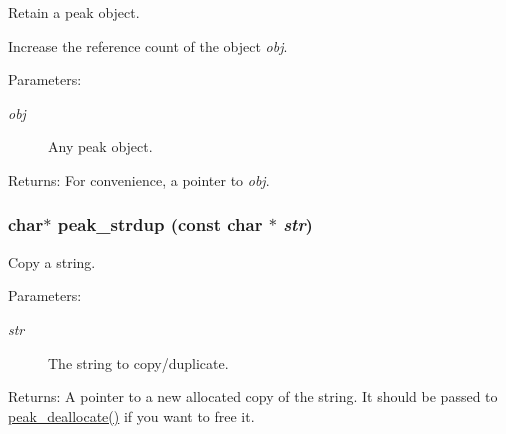 Retain a peak object. 

Increase the reference count of the object {\em obj\/}.

\begin{Desc}
\item[Parameters:]
\begin{description}
\item[{\em obj}]Any peak object.\end{description}
\end{Desc}
\begin{Desc}
\item[Returns:]For convenience, a pointer to {\em obj\/}. \end{Desc}
\hypertarget{group__alloc_ga5}{
\subsubsection[peak\_\-strdup]{\setlength{\rightskip}{0pt plus 5cm}char$\ast$ peak\_\-strdup (const char $\ast$ {\em str})}}
\label{group__alloc_ga5}


Copy a string. 

\begin{Desc}
\item[Parameters:]
\begin{description}
\item[{\em str}]The string to copy/duplicate.\end{description}
\end{Desc}
\begin{Desc}
\item[Returns:]A pointer to a new allocated copy of the string. It should be passed to \hyperlink{group__alloc_ga5}{peak\_\-deallocate()} if you want to free it. \end{Desc}
